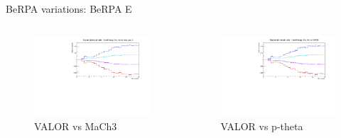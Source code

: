 \documentclass{beamer}
\begin{document}
\begin{frame}{BeRPA variations: BeRPA E}
	\centering
	\begin{columns}
		\begin{column}{0.5\paperwidth}
			\begin{figure}
				\includegraphics[page=10, trim={0cm 0cm 0cm 0cm}, clip, scale=0.35] {images/variations/valor_mach3/variations_prebanff_unosc_1Re}
				\caption*{VALOR vs MaCh3}
			\end{figure}
		\end{column}
		\begin{column}{0.5\paperwidth}
			\begin{figure}
				\includegraphics[page=20, trim={0cm 0cm 0cm 0cm}, clip, scale=0.35] {images/variations/valor_ptheta/variations_prebanff_unosc_1Re}
				\caption*{VALOR vs p-theta}
			\end{figure}
		\end{column}
	\end{columns}
\end{frame}
\end{document}
